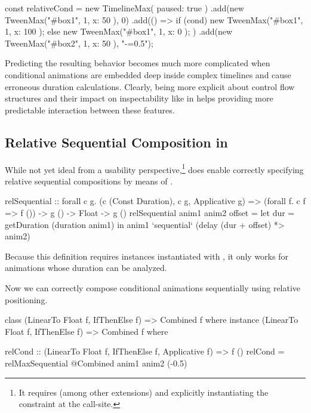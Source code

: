 \begin{js}
const relativeCond = new TimelineMax({ paused: true })
  .add(new TweenMax("#box1", 1, { x: 50 }), 0)
  .add(() => { if (cond) { new TweenMax("#box1", 1, { x: 100 });
               } else { new TweenMax("#box1", 1, { x: 0 }); } })
  .add(new TweenMax("#box2", 1, { x: 50 }), "-=0.5");
\end{js}

Predicting the resulting behavior becomes much more complicated when
conditional animations are embedded deep inside complex timelines and cause
erroneous duration calculations.  Clearly, being more explicit about control
flow structures and their impact on inspectability like in \dsl{} helps
providing more predictable interaction between these features.

\subsection{Relative Sequential Composition in \dsl{}}

While not yet ideal from a usability perspective,\footnote{It
requires
 (among other extensions) and explicitly instantiating the
constraint  at the call-site.
}
 \dsl{} does enable correctly
specifying relative sequential compositions by means of .
\begin{spec}
relSequential :: forall c g.
  (c (Const Duration), c g, Applicative g) =>
  (forall f. c f => f ()) -> g () -> Float -> g ()
relSequential anim1 anim2 offset = let
  dur = getDuration (duration anim1)
  in anim1 `sequential` (delay (dur + offset) *> anim2)
\end{spec}

Because this definition requires instances instantiated with ,
it only works for animations whose duration can be analyzed. 

Now we can correctly compose conditional animations sequentially using
relative positioning.

\begin{spec}
class (LinearTo Float f, IfThenElse f) => Combined f where
instance (LinearTo Float f, IfThenElse f) => Combined f where

relCond :: (LinearTo Float f, IfThenElse f, Applicative f) => f ()
relCond = relMaxSequential @Combined anim1 anim2 (-0.5)
\end{spec}


